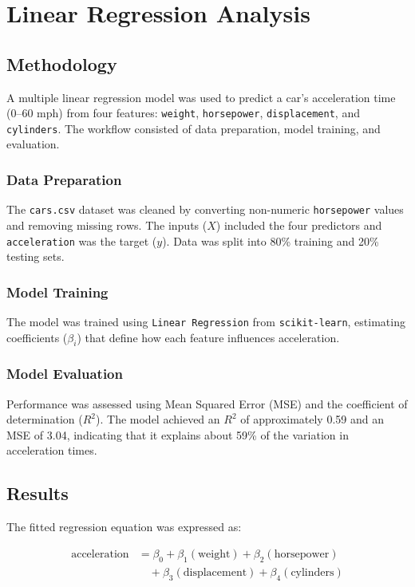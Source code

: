 \documentclass[a4paper, twocolumn]{article}
\begin{document}
\section{Linear Regression Analysis}

\subsection{Methodology}
A multiple linear regression model was used to predict a car’s acceleration time (0–60 mph) from four features: \texttt{weight}, \texttt{horsepower}, \texttt{displacement}, and \texttt{cylinders}. The workflow consisted of data preparation, model training, and evaluation.

\subsubsection{Data Preparation}
The \texttt{cars.csv} dataset was cleaned by converting non-numeric \texttt{horsepower} values and removing missing rows. The inputs ($X$) included the four predictors and \texttt{acceleration} was the target ($y$). Data was split into 80\% training and 20\% testing sets.

\subsubsection{Model Training}
The model was trained using \texttt{Linear Regression} from \texttt{scikit-learn}, estimating coefficients ($\beta_i$) that define how each feature influences acceleration.

\subsubsection{Model Evaluation}
Performance was assessed using Mean Squared Error (MSE) and the coefficient of determination ($R^2$). The model achieved an $R^2$ of approximately 0.59 and an MSE of 3.04, indicating that it explains about 59\% of the variation in acceleration times.

\subsection{Results}
The fitted regression equation was expressed as:

\begin{align}
\text{acceleration} &= \beta_0 + \beta_1(\text{weight}) + \beta_2(\text{horsepower}) \nonumber \\
&\quad + \beta_3(\text{displacement}) + \beta_4(\text{cylinders})
\end{align}
\end{document}
